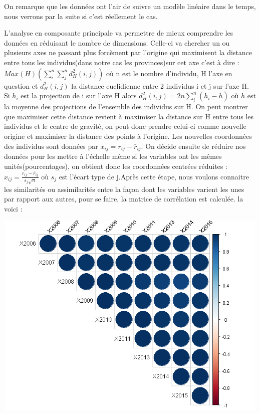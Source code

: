 \documentclass{article}
\begin{document}
On remarque que les données ont l'air de suivre un modèle linéaire dans le temps, nous verrons par la suite si c'est réellement le cas. 

L'analyse en composante principale va permettre de mieux comprendre les données en réduisant le nombre de dimensions. Celle-ci va chercher un ou plusieurs axes ne passant plus forcèment par l'origine qui maximisent la distance entre tous les individus(dans notre cas les provinces)sur cet axe c'est à dire : $Max(H)(\sum_i^n \sum_j^n d_H^2(i,j))$ où n est le nombre d'individu, H l'axe en question et $d^2_H(i,j)$ la distance euclidienne entre 2 individus i et j sur l'axe H. Si $h_i$ est la projection de i sur l'axe H alors $d^2_H(i,j)=2n \sum_i^n (h_i - \bar{h})$ où $\bar{h}$ est la moyenne des projections de l'ensemble des individus sur H. On peut montrer que maximiser cette distance revient à maximiser la distance sur H entre tous les individus et le centre de gravité, on peut donc prendre celui-ci comme nouvelle origine et maximiser la distance des points à l'origine. Les nouvelles coordonnées des individus sont données par $x_{ij}=r_{ij} - \bar{r}_{ij}$. On décide ensuite de réduire nos données pour les mettre à l'échelle même si les variables ont les mêmes unités(pourcentages), on obtient donc les coordonnées centrées réduites : $x_{ij}=\frac{r_{ij} - \bar{r}_{ij}}{s_j \sqrt{n}}$ où $s_j$ est l'écart type de j.Après cette étape, nous voulons connaitre les similarités ou assimilarités entre la façon dont les variables varient les unes par rapport aux autres, pour se faire, la matrice de corrélation est calculée. la voici :
 
 \includegraphics[width=15cm,height=10cm]{"Corr"}
 
\end{document}
